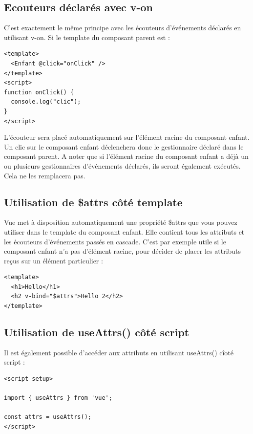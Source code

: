 \subsection{Ecouteurs déclarés avec {\color{monOrange}v-on}}
C'est exactement le même principe avec les écouteurs d'événements déclarés en utilisant {\color{monOrange}v-on}. Si le {\color{monOrange}template} du composant parent est :
\begin{verbatim}
<template>
  <Enfant @click="onClick" />
</template>
<script>
function onClick() {
  console.log("clic");
}
</script>
\end{verbatim}
L'écouteur sera placé automatiquement sur l'élément racine du composant enfant. Un clic sur le composant enfant déclenchera donc le gestionnaire déclaré dans le composant parent. A noter que si l'élément racine du composant enfant a déjà un ou plusieurs gestionnaires d'événements déclarés, ils seront également exécutés. Cela ne les remplacera pas.

\subsection{Utilisation de {\color{monOrange}\$attrs} côté {\color{monOrange}template}}
{\color{monOrange}Vue} met à disposition automatiquement une propriété {\color{monOrange}\$attrs} que vous pouvez utiliser dans le {\color{monOrange}template} du composant enfant. Elle contient tous les attributs et les écouteurs d'événements passés en cascade. C'est par exemple utile si le composant enfant n'a pas d'élément racine, pour décider de placer les attributs reçus sur un élément particulier :
\begin{verbatim}
<template>
  <h1>Hello</h1>
  <h2 v-bind="$attrs">Hello 2</h2>
</template>
\end{verbatim}
\subsection{Utilisation de {\color{monOrange}useAttrs()} côté {\color{monOrange}script}}
Il est également possible d'accéder aux attributs en utilisant {\color{monOrange}useAttrs()} cîoté {\color{monOrange}script} :
\begin{verbatim}
<script setup>
  
import { useAttrs } from 'vue';

const attrs = useAttrs();
</script>
\end{verbatim}
